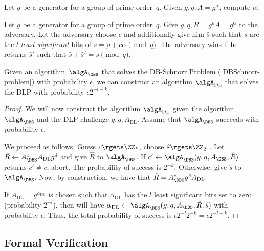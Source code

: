 \begin{definition}
  Let \(g\) be a generator for a group of prime order~\(q\).
  Given \(g, q, A = g^\alpha\), compute \(\alpha\).
\end{definition}

\begin{definition}%
  \label{DBSchnorr-problem}
  Let \(g\) be a generator for a group of prime order~\(q\).
  Give \(g, q, R = g^\rho A = g^\alpha\) to the adversary.
  Let the adversary choose \(c\) and additionally give him \(\hat s\) such that 
  \(\hat s\) are the \(l\) \emph{least significant} bits of \(s = \rho + 
  c\alpha \pmod q\).
  The adversary wins if he returns \(\hat s'\) such that \(\hat s + \hat s' = s 
  \pmod q\).
\end{definition}

\begin{lemma}
  Given an algorithm~\(\algA_{\DBS}\) that solves the DB-Schnorr Problem 
  (\cref{DBSchnorr-problem}) with probability \(\epsilon\), we can construct an 
  algorithm \(\algA_{\text{DL}}\) that solves the \ac{DLP} with probability 
  \(\epsilon 2^{-l-k}\).
\end{lemma}

\begin{proof}
  We will now construct the algorithm \(\algA_{\text{DL}}\) given the algorithm 
  \(\algA_{\DBS}\) and the \ac{DLP} challenge \(g, q, A_{\text{DL}}\).
  Assume that \(\algA_{\DBS}\) succeeds with probability \(\epsilon\).

  We proceed as follows.
  Guess \(c\rgets \ZZ_k\), choose \(\hat s\rgets \ZZ_{2^l}\).
  Let \(\hat R\gets A_{\DBS}^c A_{\text{DL}} g^{\hat s}\) and give
  \(\hat R\) to \(\algA_{\DBS}\).
  If \(c'\gets \algA_{\DBS}(g, q, A_{\DBS}, \hat R)\) returns \(c'\neq c\), 
  abort.
  The probability of success is \(2^{-k}\).
  Otherwise, give \(\hat s\) to \(\algA_{\DBS}\).
  Now, by construction, we have that \(
    \hat R = A_{\DBS}^c g^{\hat s} A_{\text{DL}}.
  \)

  If \(A_{\text{DL}} = g^{\alpha_{\text{DL}}}\) is chosen such that 
  \(\alpha_{\text{DL}}\) has the \(l\) least significant bits set to zero 
  (probability \(2^{-l}\)), then will have \(
    \alpha_{\text{DL}}\gets \algA_{\DBS}(g, q, A_{\DBS}, \hat R, \hat s)
  \) with probability \(\epsilon\).
  Thus, the total probability of success is \(
    \epsilon 2^{-l} 2^{-k} = \epsilon 2^{-l-k}.
  \)
\end{proof}

\subsection{Formal Verification}

